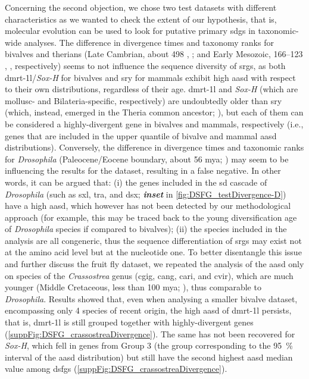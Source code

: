 Concerning the second objection, we chose two test datasets with different characteristics as we wanted to check the extent of our hypothesis, that is, molecular evolution can be used to look for putative primary \glspl{sdg} in taxonomic-wide analyses. The difference in divergence times and taxonomy ranks for bivalves and therians (Late Cambrian, about 498 , ; and Early Mesozoic, 166--123 , , respectively) seems to not influence the sequence diversity of \glspl{srg}, as both \gls{dmrt-1l}/\textit{Sox-H} for bivalves and \gls{sry} for mammals exhibit high \gls{aasd} with respect to their own distributions, regardless of their age. \gls{dmrt-1l} and \textit{Sox-H} (which are mollusc- and Bilateria-specific, respectively) are undoubtedly older than \gls{sry} (which, instead, emerged in the Theria common ancestor; ), but each of them can be considered a highly-divergent gene in bivalves and mammals, respectively (i.e., genes that are included in the \fivepercent upper quantile of bivalve and mammal \gls{aasd} distributions). Conversely, the difference in divergence times and taxonomic ranks for \textit{Drosophila} (Paleocene/Eocene boundary, about 56 \gls{mya}; ) may seem to be influencing the results for the dataset, resulting in a false negative. In other words, it can be argued that: (i) the genes included in the \gls{sd} cascade of \textit{Drosophila} (such as \gls{sxl}, \gls{tra}, and \gls{dsx}; \textbf{\textit{inset}} in \cref{fig:DSFG_testDivergence-D}) have a high \gls{aasd}, which however has not been detected by our methodological approach (for example, this may be traced back to the young diversification age of \textit{Drosophila} species if compared to bivalves); (ii) the species included in the analysis are all congeneric, thus the sequence differentiation of \glspl{srg} may exist not at the amino acid level but at the nucleotide one. To better disentangle this issue and further discuss the fruit fly dataset, we repeated the analysis of the \gls{aasd} only on species of the \textit{Crassostrea} genus (\gls{cgig}, \gls{cang}, \gls{cari}, and \gls{cvir}), which are much younger (Middle Cretaceous, less than 100 \gls{mya}; ), thus comparable to \textit{Drosophila}. Results showed that, even when analysing a smaller bivalve dataset, encompassing only 4 species of recent origin, the high \gls{aasd} of \gls{dmrt-1l} persists, that is, \gls{dmrt-1l} is still grouped together with highly-divergent genes (\cref{suppFig:DSFG_crassostreaDivergence}). The same has not been recovered for \textit{Sox-H}, which fell in genes from Group 3 (the group corresponding to the \qty{95}{\percent} interval of the \gls{aasd} distribution) but still have the second highest \gls{aasd} median value among \glspl{dsfg} (\cref{suppFig:DSFG_crassostreaDivergence}).

